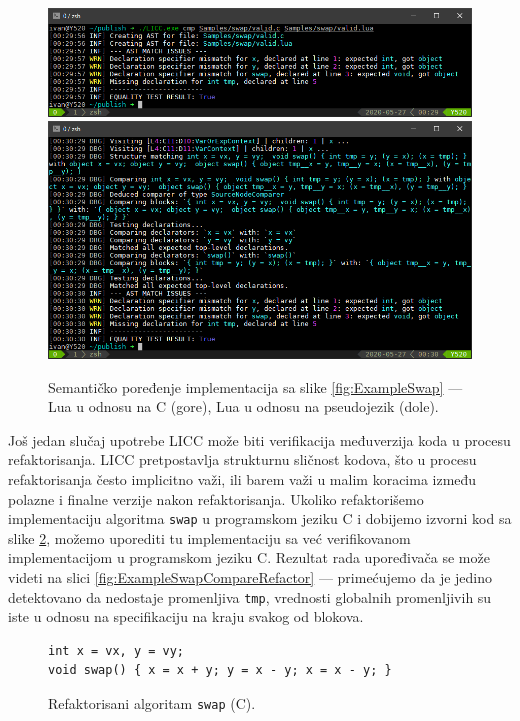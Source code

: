 \begin{figure}[h!]
\centering
\includegraphics[scale=0.7]{images/eval/cmp_rewrite.png}
\includegraphics[scale=0.7]{images/eval/cmp_rewrite_v.png}
\caption{Semantičko poređenje implementacija sa slike \ref{fig:ExampleSwap} --- Lua u odnosu na C (gore), Lua u odnosu na pseudojezik (dole).}
\label{fig:ExampleSwapCompareValidRewrite}
\end{figure}

Još jedan slučaj upotrebe LICC može biti verifikacija međuverzija koda u procesu refaktorisanja. LICC pretpostavlja strukturnu sličnost kodova, što u procesu refaktorisanja često implicitno važi, ili barem važi u malim koracima između polazne i finalne verzije nakon refaktorisanja. Ukoliko refaktorišemo implementaciju algoritma \texttt{swap} u programskom jeziku C i dobijemo izvorni kod sa slike \ref{fig:ExampleSwapRefactor}, možemo uporediti tu implementaciju sa već verifikovanom implementacijom u programskom jeziku C. Rezultat rada upoređivača se može videti na slici \ref{fig:ExampleSwapCompareRefactor} --- primećujemo da je jedino detektovano da nedostaje promenljiva \texttt{tmp}, vrednosti globalnih promenljivih su iste u odnosu na specifikaciju na kraju svakog od blokova.

\begin{figure}[h!]
\begin{lstlisting}
int x = vx, y = vy;
void swap() { x = x + y; y = x - y; x = x - y; }
\end{lstlisting}
\caption{Refaktorisani algoritam \texttt{swap} (C).}
\label{fig:ExampleSwapRefactor}
\end{figure}

